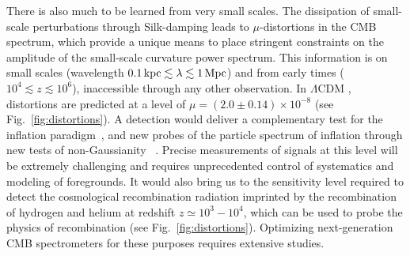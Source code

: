 There is also much to be learned from very small scales. The dissipation of small-scale perturbations through Silk-damping \citep{Sunyaev1970diss, Daly1991, Hu1994, Chluba2012} leads to $\mu$-distortions in the CMB spectrum, which provide a unique means to place stringent constraints on the amplitude of the small-scale curvature power spectrum. This information is on small scales (wavelength $0.1 \,{\rm kpc} \lesssim \lambda \lesssim 1\, {\rm Mpc}$) and from early times ($10^4 \lesssim z\lesssim 10^6$), inaccessible through any other observation. In $\Lambda$CDM \citep{Chluba2012, Chluba2016LCDM}, distortions are predicted at a level of $\mu=(2.0\pm0.14)\times 10^{-8}$ (see Fig.~\ref{fig:distortions}). A detection would deliver a complementary test for the inflation paradigm~\citep{Chluba2012inflaton, Dent2012, Chluba2013PCA, Clesse2014, Cabass2016}, and new probes of the particle spectrum of inflation through new tests of non-Gaussianity ~\citep{Pajer2012, Ganc2012, Biagetti2013, Razi2015, Chluba2016ng}. Precise measurements of signals at this level will be extremely challenging and requires unprecedented control of systematics and modeling of foregrounds. It would also bring us to the sensitivity level required to detect the cosmological recombination radiation \citep{Sunyaev2009, Chluba2016} imprinted by the recombination of hydrogen and helium at redshift $z\simeq 10^3-10^4$, which can be used to probe the physics of recombination (see Fig.~\ref{fig:distortions}). Optimizing next-generation CMB spectrometers for these purposes requires extensive studies.

